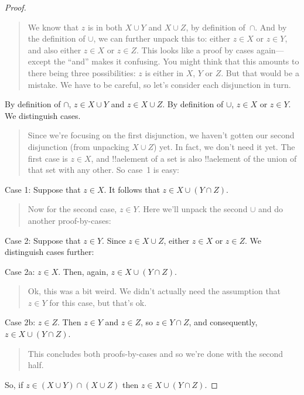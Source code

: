 \documentclass[../../../include/open-logic-section]{subfiles}
\begin{document}
\begin{proof}
\begin{quote}
We know that $z$ is in both $X \cup Y$ and $X \cup Z$, by definition
of~$\cap$. And by the definition of $\cup$, we can further unpack this
to: either $z \in X$ or $z \in Y$, and also either $z \in X$ or $z \in
Z$. This looks like a proof by cases again---except the ``and'' makes
it confusing. You might think that this amounts to there being three
possibilities: $z$ is either in $X$, $Y$ or $Z$. But that would be a
mistake.  We have to be careful, so let's consider each disjunction in
turn.
\end{quote}
By definition of $\cap$, $z \in X \cup Y$ and $z \in X \cup Z$. By
definition of $\cup$, $z \in X$ or $z \in Y$. We distinguish cases.
\begin{quote}
Since we're focusing on the first disjunction, we haven't gotten our
second disjunction (from unpacking $X \cup Z$) yet. In fact, we don't
need it yet. The first case is $z \in X$, and !!a{element} of a set is
also !!a{element} of the union of that set with any other. So case~1
is easy:
\end{quote}
Case 1: Suppose that $z \in X$. It follows that $z \in X \cup (Y \cap
Z)$.
\begin{quote}
Now for the second case, $z \in Y$. Here we'll unpack the second
$\cup$ and do another proof-by-cases:
\end{quote}
Case 2: Suppose that $z \in Y$. Since $z \in X \cup Z$, either $z \in
X$ or $z \in Z$. We distinguish cases further:

Case 2a: $z \in X$. Then, again, $z \in X \cup (Y \cap Z)$.
\begin{quote}
Ok, this was a bit weird. We didn't actually need the assumption
that~$z \in Y$ for this case, but that's ok.
\end{quote}
Case 2b: $z \in Z$. Then $z \in Y$ and $z \in Z$, so $z \in Y \cap Z$,
and consequently, $z \in X \cup (Y \cap Z)$.
\begin{quote}
This concludes both proofs-by-cases and so we're done with the second
half.
\end{quote}
So, if $z \in (X \cup Y) \cap (X \cup Z)$ then $z \in X \cup (Y \cap Z)$.
\end{proof}
\end{document}
